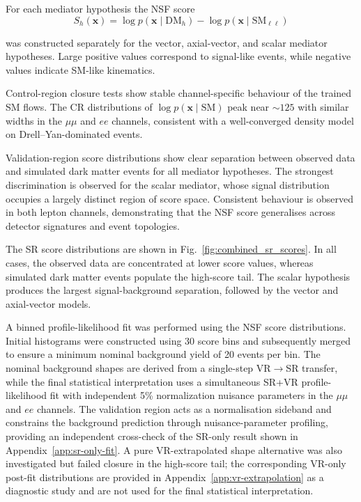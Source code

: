 \documentclass[11pt,a4paper,twocolumn]{article}
\begin{document}
For each mediator hypothesis the NSF score
\begin{equation}
S_h(\mathbf{x}) =
\log p(\mathbf{x}\mid\mathrm{DM}_h)
-
\log p(\mathbf{x}\mid\mathrm{SM}_{\ell\ell})
\end{equation}

was constructed separately for the vector, axial-vector, and scalar mediator hypotheses. Large positive values correspond to signal-like events, while negative values indicate SM-like kinematics.

Control-region closure tests show stable channel-specific behaviour of the
trained SM flows. The CR distributions of $\log p(\mathbf{x}\mid\mathrm{SM})$
peak near $\sim 125$ with similar widths in the $\mu\mu$ and $ee$ channels,
consistent with a well-converged density model on Drell--Yan-dominated events.

Validation-region score distributions show clear separation between observed
data and simulated dark matter events for all mediator hypotheses. The
strongest discrimination is observed for the scalar mediator, whose signal
distribution occupies a largely distinct region of score space. Consistent
behaviour is observed in both lepton channels, demonstrating that the NSF
score generalises across detector signatures and event topologies.

The SR score distributions are shown in Fig.~\ref{fig:combined_sr_scores}. In all cases, the observed data are concentrated at lower score values, whereas simulated dark matter events populate the high-score tail. The scalar hypothesis produces the largest signal-background separation, followed by the vector and axial-vector models.

A binned profile-likelihood fit was performed using the NSF score distributions.
Initial histograms were constructed using 30 score bins and subsequently merged
to ensure a minimum nominal background yield of 20 events per bin. The nominal
background shapes are derived from a single-step VR$\to$SR transfer, while the
final statistical interpretation uses a simultaneous SR+VR profile-likelihood
fit with independent 5\% normalization nuisance parameters in the $\mu\mu$
and $ee$ channels. The validation region acts as a normalisation sideband and
constrains the background prediction through nuisance-parameter profiling,
providing an independent cross-check of the SR-only result shown in
Appendix~\ref{app:sr-only-fit}.
A pure VR-extrapolated shape alternative was also investigated but failed closure in the high-score tail; the corresponding VR-only post-fit distributions are provided in Appendix~\ref{app:vr-extrapolation} as a diagnostic study and are not used for the final statistical interpretation.
\end{document}
